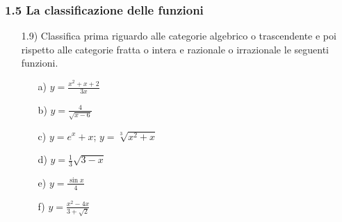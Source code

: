 \subsubsection*{1.5 La classificazione delle funzioni}
\begin{itemize}
  \item[1.9)] Classifica prima riguardo alle categorie algebrico o 
trascendente e poi rispetto alle categorie fratta o intera e razionale o 
irrazionale le seguenti funzioni.
  \begin{itemize}
  \item[a)] \(y=\frac{x^2+x+2}{3x}\)
  \item[b)] \(y=\frac{4}{\sqrt{x-6}}\)
  \item[c)] \(y=e^x+x\); \(y=\sqrt[3]{x^2+x}\)
  \item[d)] \(y=\frac{1}{3}\sqrt{3-x}\)
  \item[e)] \(y=\frac{\sin x}{4}\)
  \item[f)] \(y=\frac{x^2-4x}{3+\sqrt{2}}\)
  \end{itemize}
\end{itemize}

